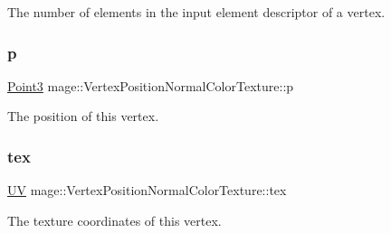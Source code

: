 The number of elements in the input element descriptor of a vertex. \hypertarget{structmage_1_1_vertex_position_normal_color_texture_ac7808865ca6672b7d0f4f8457077bd16}{}\label{structmage_1_1_vertex_position_normal_color_texture_ac7808865ca6672b7d0f4f8457077bd16} 
\subsubsection{\texorpdfstring{p}{p}}
{\footnotesize\ttfamily \hyperlink{structmage_1_1_point3}{Point3} mage\+::\+Vertex\+Position\+Normal\+Color\+Texture\+::p}

The position of this vertex. \hypertarget{structmage_1_1_vertex_position_normal_color_texture_a3477ce06d0778a1119cbf2e961d7c3ed}{}\label{structmage_1_1_vertex_position_normal_color_texture_a3477ce06d0778a1119cbf2e961d7c3ed} 
\subsubsection{\texorpdfstring{tex}{tex}}
{\footnotesize\ttfamily \hyperlink{structmage_1_1_u_v}{UV} mage\+::\+Vertex\+Position\+Normal\+Color\+Texture\+::tex}

The texture coordinates of this vertex. 